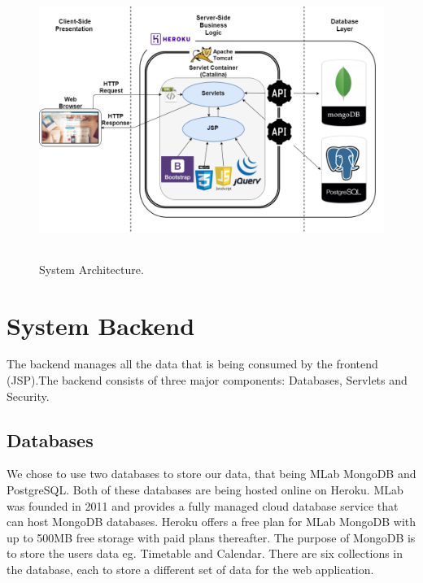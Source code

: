 \begin{figure}[h]
\centering
\includegraphics[width=13cm, height=9cm]{img/Architecture}
\caption{System Architecture.}
\end{figure}

\section{System Backend}
The backend manages all the data that is being consumed by the frontend
(JSP).The backend consists of three major components: Databases, Servlets and Security.

\subsection{Databases}
We chose to use two databases to store our data, that being MLab MongoDB and PostgreSQL. Both of these databases are being hosted online on Heroku. MLab was founded in 2011 and provides a fully managed cloud database service that can host MongoDB databases. Heroku offers a free plan for MLab MongoDB with up to 500MB free storage with paid plans thereafter. The purpose of MongoDB is to store the users data eg. Timetable and Calendar. There are six collections in the database, each to store a different set of data for the web application.

